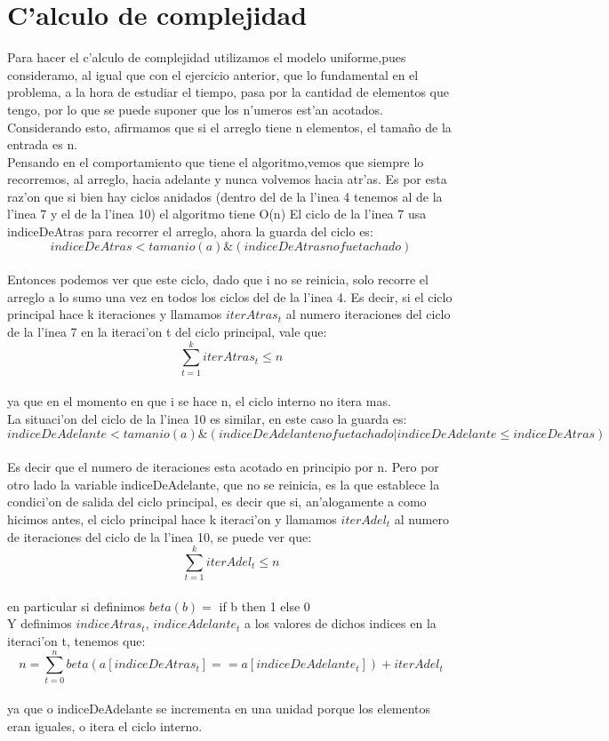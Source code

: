 \section{C'alculo de complejidad}
Para hacer el c'alculo de complejidad utilizamos el modelo uniforme,pues consideramo, al igual que con el ejercicio anterior, que lo fundamental en el problema, a la hora de estudiar el tiempo, pasa por la cantidad de elementos que tengo, por lo que se puede suponer que los n'umeros est'an acotados. \\
Considerando esto, afirmamos que si el arreglo tiene n  elementos, el tama\~{n}o de la entrada es n.\\
Pensando en el comportamiento que tiene el algoritmo,vemos que siempre lo recorremos, al arreglo, hacia adelante y nunca volvemos hacia atr'as. Es por esta raz'on que si bien hay ciclos anidados (dentro del de la l'inea 4 tenemos al de la l'inea 7 y el de la l'inea 10) el algoritmo tiene O(n)
El ciclo de la l'inea 7 usa indiceDeAtras para recorrer el arreglo, ahora la guarda del ciclo es:\\
$$indiceDeAtras < tamanio(a) \& (indiceDeAtras no fue tachado)$$\\ 
Entonces podemos ver que este ciclo, dado que i no se reinicia, solo recorre el arreglo a lo sumo una vez en todos los ciclos del de la l'inea 4. Es decir, si el ciclo principal hace k iteraciones y llamamos $iterAtras_t$ al numero iteraciones del ciclo de la l'inea 7 en la iteraci'on t del ciclo principal, vale que:\\
$$\sum_{t=1}^{k}iterAtras_t \leq n$$\\
ya que en el momento en que i se hace n, el ciclo interno no itera mas.\\
La situaci'on del ciclo de la l'inea 10 es similar, en este caso la guarda es:\\
$$indiceDeAdelante < tamanio(a) \& (indiceDeAdelante no fue tachado | indiceDeAdelante \leq indiceDeAtras)$$\\
Es decir que el numero de iteraciones esta acotado en principio por n. Pero por otro lado la variable indiceDeAdelante, que no se reinicia, es la que establece la condici'on de salida del ciclo principal, es decir que si, an'alogamente a como hicimos antes, el ciclo principal hace k iteraci'on y llamamos $iterAdel_t$ al numero de iteraciones del ciclo de la l'inea 10, se puede ver que:\\
$$\sum_{t=1}^{k}iterAdel_t \leq n$$\\
en particular si definimos
$beta(b) =$ if b then 1 else 0 \\
Y definimos $indiceAtras_t$, $indiceAdelante_t$ a los valores de dichos indices en la iteraci'on t, tenemos que:\\
$$n=\sum_{t=0}^{n}beta(a[indiceDeAtras_t] == a[indiceDeAdelante_t])+ iterAdel_t$$\\
ya que o indiceDeAdelante se incrementa en una unidad porque los elementos eran iguales, o itera el ciclo interno.\\

